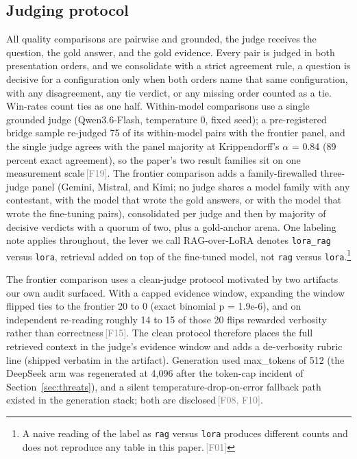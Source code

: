 \documentclass[11pt]{article}
\newcommand{\rcpt}[1]{\textcolor{gray}{\,\textsf{\scriptsize[#1]}}}
\begin{document}
\subsection{Judging protocol}
\label{sec:judging}

All quality comparisons are pairwise and grounded, the judge receives the question, the gold answer, and the gold evidence. Every pair is judged in both presentation orders, and we consolidate with a strict agreement rule, a question is decisive for a configuration only when both orders name that same configuration, with any disagreement, any tie verdict, or any missing order counted as a tie. Win-rates count ties as one half. Within-model comparisons use a single grounded judge (Qwen3.6-Flash, temperature 0, fixed seed); a pre-registered bridge sample re-judged 75 of its within-model pairs with the frontier panel, and the single judge agrees with the panel majority at Krippendorff's $\alpha$ = 0.84 (89 percent exact agreement), so the paper's two result families sit on one measurement scale\rcpt{F19}. The frontier comparison adds a family-firewalled three-judge panel (Gemini, Mistral, and Kimi; no judge shares a model family with any contestant, with the model that wrote the gold answers, or with the model that wrote the fine-tuning pairs), consolidated per judge and then by majority of decisive verdicts with a quorum of two, plus a gold-anchor arena. One labeling note applies throughout, the lever we call RAG-over-LoRA denotes \texttt{lora\_rag} versus \texttt{lora}, retrieval added on top of the fine-tuned model, not \texttt{rag} versus \texttt{lora}.\footnote{A naive reading of the label as \texttt{rag} versus \texttt{lora} produces different counts and does not reproduce any table in this paper.\rcpt{F01}}

The frontier comparison uses a clean-judge protocol motivated by two artifacts our own audit surfaced. With a capped evidence window, expanding the window flipped ties to the frontier 20 to 0 (exact binomial p = 1.9e-6), and on independent re-reading roughly 14 to 15 of those 20 flips rewarded verbosity rather than correctness\rcpt{F15}. The clean protocol therefore places the full retrieved context in the judge's evidence window and adds a de-verbosity rubric line (shipped verbatim in the artifact). Generation used max\_tokens of 512 (the DeepSeek arm was regenerated at 4{,}096 after the token-cap incident of Section~\ref{sec:threats}), and a silent temperature-drop-on-error fallback path existed in the generation stack; both are disclosed\rcpt{F08, F10}.
\end{document}

